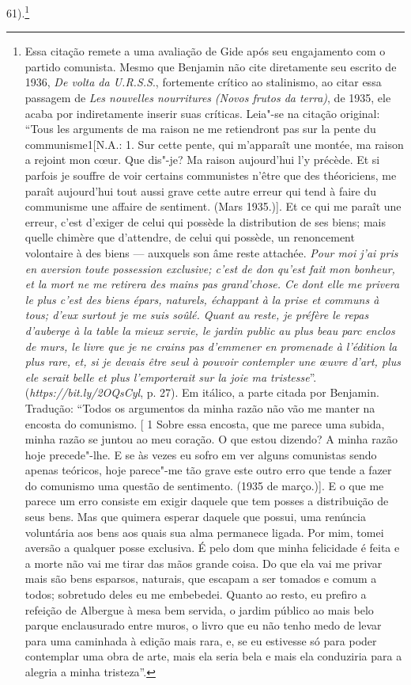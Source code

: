 61).\footnote{Essa citação remete a uma avaliação de Gide após seu
  engajamento com o partido comunista. Mesmo que Benjamin não cite
  diretamente seu escrito de 1936, \emph{De volta da U.R.S.S}.,
  fortemente crítico ao stalinismo, ao citar essa passagem de \emph{Les
  nouvelles nourritures} \emph{(Novos frutos da terra)}, de 1935, ele
  acaba por indiretamente inserir suas críticas. Leia"-se na citação
  original: ``Tous les arguments de ma raison ne me retiendront pas sur
  la pente du communisme1{[}N.A.: 1. Sur cette pente, qui m'apparaît une
  montée, ma raison a rejoint mon cœur. Que dis"-je? Ma raison
  aujourd'hui l'y précède. Et si parfois je souffre de voir certains
  communistes n'être que des théoriciens, me paraît aujourd'hui tout
  aussi grave cette autre erreur qui tend à faire du communisme une
  affaire de sentiment. (Mars 1935.){]}. Et ce qui me paraît une erreur,
  c'est d'exiger de celui qui possède la distribution de ses biens; mais
  quelle chimère que d'attendre, de celui qui possède, un renoncement
  volontaire à des biens --- auxquels son âme reste attachée. \emph{Pour
  moi j'ai pris en aversion toute possession exclusive; c'est de don
  qu'est fait mon bonheur, et la mort ne me retirera des mains pas
  grand'chose. Ce dont elle me privera le plus c'est des biens épars,
  naturels, échappant à la prise et communs à tous; d'eux surtout je me
  suis soûlé. Quant au reste, je préfère le repas d'auberge à la table
  la mieux servie, le jardin public au plus beau parc enclos de murs, le
  livre que je ne crains pas d'emmener en promenade à l'édition}
  \emph{la plus rare, et, si je devais être seul à pouvoir contempler
  une œuvre d'art, plus ele serait belle et plus l'}\emph{emporterait
  sur la joie ma tristesse}''.
  (\emph{https://bit.ly/2OQsCyl}, p. 27). Em itálico, a parte citada por Benjamin. Tradução: ``Todos os
  argumentos da minha razão não vão me manter na encosta do
  comunismo. [ 1 Sobre essa encosta, que me parece uma subida,
  minha razão se juntou ao meu coração. O que estou dizendo? A minha
  razão hoje precede"-lhe. E se às vezes eu sofro em ver alguns
  comunistas sendo apenas teóricos, hoje parece"-me tão grave este outro
  erro que tende a fazer do comunismo uma questão de sentimento. (1935
  de março.)]. E o que me parece um erro consiste em exigir daquele
  que tem posses a distribuição de seus bens. Mas que quimera esperar
  daquele que possui, uma renúncia voluntária aos bens aos quais sua
  alma permanece ligada. Por mim, tomei aversão a qualquer posse
  exclusiva. É pelo dom que minha felicidade é feita e a morte não vai
  me tirar das mãos grande coisa. Do que ela vai me privar mais são bens
  esparsos, naturais, que escapam a ser tomados e comum a todos;
  sobretudo deles eu me embebedei. Quanto ao resto, eu prefiro a
  refeição de Albergue à mesa bem servida, o jardim público ao mais belo
  parque enclausurado entre muros, o livro que eu não tenho medo de
  levar para uma caminhada à edição mais rara, e, se eu estivesse só
  para poder contemplar uma obra de arte, mais ela seria bela e mais ela
  conduziria para a alegria a minha tristeza''. \versal{[N. E.]}}

